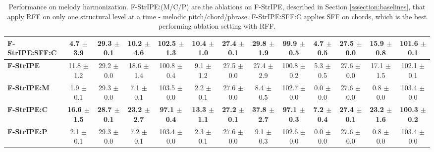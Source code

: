 \begin{table*}[t]
{\begin{tabular}{lcccccccccccc}
\multicolumn{1}{l|}{\textbf{F-StrIPE:SFF:C}} & \phantom{0}4.7 $\pm$ 3.9 & 29.3 $\pm$ 0.1 & 10.2 $\pm$ 4.6 & \multicolumn{1}{c|}{102.5 $\pm$ 1.3} & 10.4 $\pm$ 1.0 & 27.4 $\pm$ 0.1 & 29.8 $\pm$ 1.9 & \multicolumn{1}{c|}{\phantom{0}99.9 $\pm$ 0.5} & \phantom{0}4.7 $\pm$ 0.5 & 27.5 $\pm$ 0.0 & 15.9 $\pm$ 0.8 & 101.6 $\pm$ 0.1 \\ \hline
\multicolumn{1}{l|}{\textbf{F-StrIPE}}  & 11.8 $\pm$ 1.2 & 29.2 $\pm$ 0.0 & 18.6 $\pm$ 1.4 & \multicolumn{1}{c|}{100.8 $\pm$ 0.4} & \phantom{0}9.1 $\pm$ 1.2 & 27.5 $\pm$ 0.0 & 27.4 $\pm$ 2.9 & \multicolumn{1}{c|}{100.8 $\pm$ 0.2} & \phantom{0}5.3 $\pm$ 0.5 & 27.6 $\pm$ 0.0 & 17.1 $\pm$ 1.5 & 102.1 $\pm$ 0.1 \\
\multicolumn{1}{l|}{\textbf{F-StrIPE:M}} & \phantom{0}1.9 $\pm$ 0.1 & 29.3 $\pm$ 0.0 & \phantom{0}7.1 $\pm$ 0.1 & \multicolumn{1}{c|}{103.5 $\pm$ 0.0} & \phantom{0}2.2 $\pm$ 0.1 & 27.6 $\pm$ 0.0 & \phantom{0}8.4 $\pm$ 0.5 & \multicolumn{1}{c|}{102.7 $\pm$ 0.0} & \phantom{0}0.0 $\pm$ 0.0 & 27.6 $\pm$ 0.0 & \phantom{0}0.8 $\pm$ 0.0 & 103.4 $\pm$ 0.0 \\
\multicolumn{1}{l|}{\textbf{F-StrIPE:C}} & \textbf{16.6 $\pm$ 1.5} & \textbf{28.7 $\pm$ 0.1} & \textbf{23.2 $\pm$ 2.7} & \multicolumn{1}{c|}{\textbf{\phantom{0}97.1 $\pm$ 0.4}} & \textbf{13.3 $\pm$ 1.1} & \textbf{27.2 $\pm$ 0.1} & \textbf{37.8 $\pm$ 2.7} & \multicolumn{1}{c|}{\textbf{\phantom{0}97.1 $\pm$ 0.3}} & \textbf{\phantom{0}7.2 $\pm$ 0.4} & \textbf{27.4 $\pm$ 0.1} & \textbf{23.2 $\pm$ 1.6} & \textbf{100.3 $\pm$ 0.2} \\
\multicolumn{1}{l|}{\textbf{F-StrIPE:P}} & \phantom{0}2.1 $\pm$ 0.1 & 29.3 $\pm$ 0.0 & \phantom{0}7.2 $\pm$ 0.1 & \multicolumn{1}{c|}{103.4 $\pm$ 0.0} & \phantom{0}2.3 $\pm$ 0.1 & 27.6 $\pm$ 0.0 & \phantom{0}9.1 $\pm$ 0.3 & \multicolumn{1}{c|}{102.6 $\pm$ 0.0} & \phantom{0}0.0 $\pm$ 0.0 & 27.6 $\pm$ 0.0 & \phantom{0}0.8 $\pm$ 0.0 & 103.4 $\pm$ 0.0 \\ \hline
\end{tabular}
}
\caption{Performance on melody harmonization. F-StrIPE:(M/C/P) are the ablations on F-StrIPE, described in Section \ref{sssection:baselines}, that apply RFF on only one structural level at a time - melodic pitch/chord/phrase. F-StrIPE:SFF:C applies SFF on chords, which is the best performing ablation setting with RFF.}
\label{tab:results}
\end{table*}